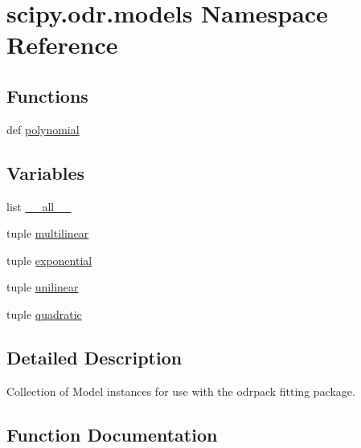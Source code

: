 \hypertarget{namespacescipy_1_1odr_1_1models}{}\section{scipy.\+odr.\+models Namespace Reference}
\label{namespacescipy_1_1odr_1_1models}
\subsection*{Functions}
\begin{DoxyCompactItemize}
\item 
def \hyperlink{namespacescipy_1_1odr_1_1models_a0e2d9f5a0a2adbd0671ebe54f6823d6c}{polynomial}
\end{DoxyCompactItemize}
\subsection*{Variables}
\begin{DoxyCompactItemize}
\item 
list \hyperlink{namespacescipy_1_1odr_1_1models_a9b3092b683b47fff822f4e988bc34614}{\+\_\+\+\_\+all\+\_\+\+\_\+}
\item 
tuple \hyperlink{namespacescipy_1_1odr_1_1models_ab3bb86f127a01e131e56a7b0b3cc05c2}{multilinear}
\item 
tuple \hyperlink{namespacescipy_1_1odr_1_1models_a296c2923f4ed3c84dffefbdb3bf2787a}{exponential}
\item 
tuple \hyperlink{namespacescipy_1_1odr_1_1models_a7edcd45543211ef835925feeab29f05c}{unilinear}
\item 
tuple \hyperlink{namespacescipy_1_1odr_1_1models_ad426febf879561a3182b93c590ee81e8}{quadratic}
\end{DoxyCompactItemize}


\subsection{Detailed Description}
\begin{DoxyVerb}Collection of Model instances for use with the odrpack fitting package.
\end{DoxyVerb}
 

\subsection{Function Documentation}
\hypertarget{namespacescipy_1_1odr_1_1models_a0e2d9f5a0a2adbd0671ebe54f6823d6c}{}
